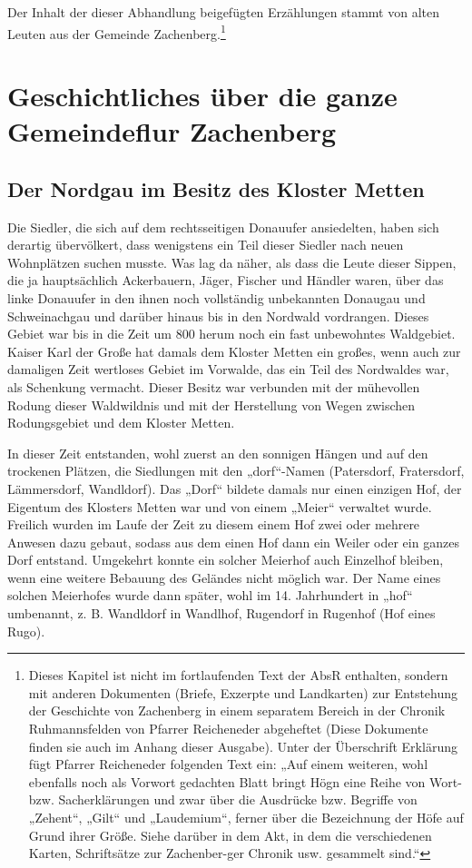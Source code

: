\documentclass{book}
\begin{document}
Der Inhalt der dieser Abhandlung beigefügten Erzählungen stammt von
alten Leuten aus der Gemeinde Zachenberg.\footnote{Dieses Kapitel ist
nicht im fortlaufenden Text der AbsR enthalten, sondern mit anderen
Dokumenten (Briefe, Exzerpte und Landkarten) zur Entstehung der
Geschichte von Zachenberg in einem separatem Bereich in der Chronik
Ruhmannsfelden von Pfarrer Reicheneder abgeheftet (Diese Dokumente
finden sie auch im Anhang dieser Ausgabe). Unter der Überschrift
Erklärung fügt Pfarrer Reicheneder folgenden Text ein: „Auf einem
weiteren, wohl ebenfalls noch als Vorwort gedachten Blatt bringt Högn
eine Reihe von Wort- bzw. Sacherklärungen und zwar über die Ausdrücke
bzw. Begriffe von „Zehent“,  „Gilt“ und „Laudemium“, ferner über die
Bezeichnung der Höfe auf Grund ihrer Größe. Siehe darüber in dem Akt, in
dem die verschiedenen Karten, Schriftsätze zur Zachenber-ger Chronik
usw. gesammelt sind.“}

\chapter[Die ganze Gemeindeflur]{Geschichtliches über die ganze
Gemeindeflur Zachenberg}

\section{Der Nordgau im Besitz des Kloster Metten}

Die Siedler, die sich auf dem rechtsseitigen Donauufer ansiedelten,
haben sich derartig übervölkert, dass wenigstens ein Teil dieser Siedler
nach neuen Wohnplätzen suchen musste. Was lag da näher, als dass die
Leute dieser Sippen, die ja hauptsächlich Ackerbauern, Jäger, Fischer
und Händler waren, über das linke Donauufer in den ihnen noch
vollständig unbekannten Donaugau und Schweinachgau und darüber hinaus
bis in den Nordwald vordrangen. Dieses Gebiet war bis in die Zeit um 800
herum noch ein fast unbewohntes Waldgebiet. Kaiser Karl der Große hat
damals dem Kloster Metten ein großes, wenn auch zur damaligen Zeit
wertloses Gebiet im Vorwalde, das ein Teil des Nordwaldes war, als
Schenkung vermacht. Dieser Besitz war verbunden mit der mühevollen
Rodung dieser Waldwildnis und mit der Herstellung von Wegen zwischen
Rodungsgebiet und dem Kloster Metten.

In dieser Zeit entstanden, wohl zuerst an den sonnigen Hängen und auf
den trockenen Plätzen, die Siedlungen mit den „dorf“-Namen (Patersdorf,
Fratersdorf, Lämmersdorf, Wandldorf). Das „Dorf“ bildete damals nur
einen einzigen Hof, der Eigentum des Klosters Metten war und von einem
„Meier“ verwaltet wurde. Freilich wurden im Laufe der Zeit zu diesem
einem Hof zwei oder mehrere Anwesen dazu gebaut, sodass aus dem einen
Hof dann ein Weiler oder ein ganzes Dorf entstand. Umgekehrt konnte ein
solcher Meierhof auch Einzelhof bleiben, wenn eine weitere Bebauung des
Geländes nicht möglich war. Der Name eines solchen Meierhofes wurde dann
später, wohl im 14. Jahrhundert in „hof“ umbenannt, z. B. Wandldorf in
Wandlhof, Rugendorf in Rugenhof (Hof eines Rugo).
\end{document}
